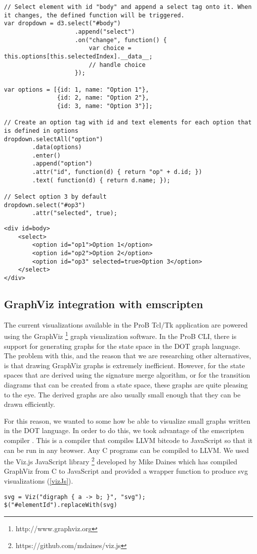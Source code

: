 \lstset{language=Java}
\begin{lstlisting}[caption=Dynamically create a dropdown menu.,label=d3Example]
// Select element with id "body" and append a select tag onto it. When it changes, the defined function will be triggered.
var dropdown = d3.select("#body")
				   	.append("select")
				   	.on("change", function() {
				   		var choice = this.options[this.selectedIndex].__data__;
				   		// handle choice
				   	});

var options = [{id: 1, name: "Option 1"},
			   {id: 2, name: "Option 2"},
			   {id: 3, name: "Option 3"}];

// Create an option tag with id and text elements for each option that is defined in options
dropdown.selectAll("option")
		.data(options)
		.enter()
		.append("option")
		.attr("id", function(d) { return "op" + d.id; })
		.text( function(d) { return d.name; });

// Select option 3 by default
dropdown.select("#op3")
		.attr("selected", true);
\end{lstlisting} 

\lstset{language=HTML}
\begin{lstlisting}[caption=Html generated from (\ref{d3Example}),label=d3Result]
<div id=body>
    <select>
        <option id="op1">Option 1</option>
        <option id="op2">Option 2</option>
        <option id="op3" selected=true>Option 3</option>
    </select>
</div>
\end{lstlisting}


\subsection{GraphViz integration with emscripten}

The current visualizations available in the ProB Tcl/Tk application are powered using the GraphViz \footnote{http://www.graphviz.org} graph visualization software. In the ProB CLI, there is support for generating graphs for the state space in the DOT graph language. The problem with this, and the reason that we are researching other alternatives, is that drawing GraphViz graphs is extremely inefficient. However, for the state spaces that are derived using the signature merge algorithm, or for the transition diagrams that can be created from a state space, these graphs are quite pleasing to the eye. The derived graphs are also usually small enough that they can be drawn efficiently.

For this reason, we wanted to some how be able to visualize small graphs written in the DOT language. In order to do this, we took advantage of the emscripten compiler \cite{emscripten}. This is a compiler that compiles LLVM bitcode to JavaScript so that it can be run in any browser. Any C programs can be compiled to LLVM. We used the Viz.js JavaScript library \footnote{https://github.com/mdaines/viz.js} developed by Mike Daines which has compiled GraphViz from C to JavaScript and provided a wrapper function to produce svg visualizations (\ref{vizJs}).

\begin{lstlisting}[caption=Create a visualization with viz.js and insert it into an html page.,label=vizJs]
svg = Viz("digraph { a -> b; }", "svg");
$("#elementId").replaceWith(svg)
\end{lstlisting}